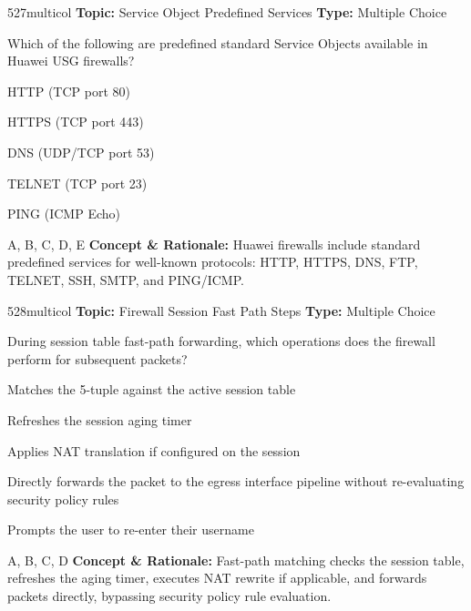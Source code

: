 \begin{qcard}{527}{multicol}
\textcolor{darkslate!75}{\small\textbf{Topic:} Service Object Predefined Services \hfill \textbf{Type:} Multiple Choice}\vspace{0.4em}\par
Which of the following are predefined standard Service Objects available in Huawei USG firewalls?
\begin{qoptions}
\item HTTP (TCP port 80)
\item HTTPS (TCP port 443)
\item DNS (UDP/TCP port 53)
\item TELNET (TCP port 23)
\item PING (ICMP Echo)
\end{qoptions}
\end{qcard}
\nopagebreak
\begin{explainbox}{A, B, C, D, E}
\textbf{Concept \& Rationale:} Huawei firewalls include standard predefined services for well-known protocols: HTTP, HTTPS, DNS, FTP, TELNET, SSH, SMTP, and PING/ICMP.
\end{explainbox}

\begin{qcard}{528}{multicol}
\textcolor{darkslate!75}{\small\textbf{Topic:} Firewall Session Fast Path Steps \hfill \textbf{Type:} Multiple Choice}\vspace{0.4em}\par
During session table fast-path forwarding, which operations does the firewall perform for subsequent packets?
\begin{qoptions}
\item Matches the 5-tuple against the active session table
\item Refreshes the session aging timer
\item Applies NAT translation if configured on the session
\item Directly forwards the packet to the egress interface pipeline without re-evaluating security policy rules
\item Prompts the user to re-enter their username
\end{qoptions}
\end{qcard}
\nopagebreak
\begin{explainbox}{A, B, C, D}
\textbf{Concept \& Rationale:} Fast-path matching checks the session table, refreshes the aging timer, executes NAT rewrite if applicable, and forwards packets directly, bypassing security policy rule evaluation.
\end{explainbox}

